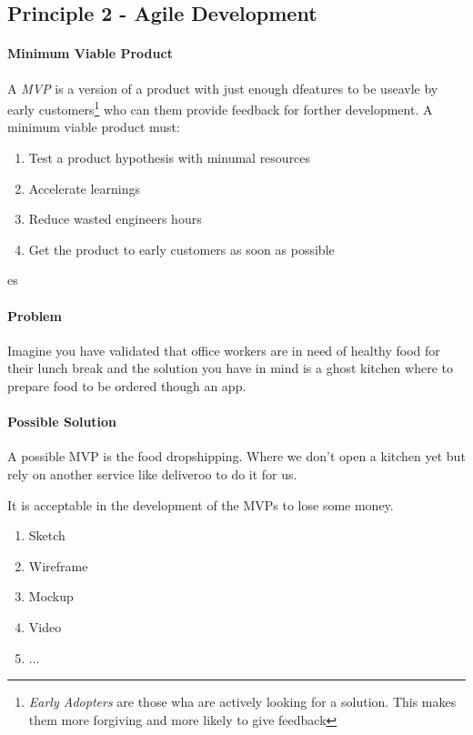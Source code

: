 \documentclass{article}
\begin{document}
\subsection{Principle 2 - Agile Development}
\paragraph{Minimum Viable Product}
A \textit{MVP} is a version of a product with just enough dfeatures to be useavle by early customers\footnote{\textit{Early Adopters} are those wha are actively looking for a solution. This makes them more forgiving and more likely to give feedback} who can them provide feedback for forther development. 
A minimum viable product must: \begin{enumerate}
    \item Test a product hypothesis with minumal resources
    \item Accelerate learnings
    \item Reduce wasted engineers hours
    \item Get the product to early customers as soon as possible
\end{enumerate}

\begin{esempio}{es}
    \paragraph{Problem}
    Imagine you have validated that office workers are in need of healthy food for their lunch break and the solution you have in mind is a ghost kitchen where to prepare food to be ordered though an app.
    \paragraph{Possible Solution}
    A possible MVP is the food dropshipping. Where we don't open a kitchen yet but rely on another service like deliveroo to do it for us. 
\end{esempio}

It is acceptable in the development of the MVPs to lose some money.

\begin{enumerate}
    \item Sketch
    \item Wireframe
    \item Mockup
    \item Video
    \item ...
\end{enumerate}
\end{document}
